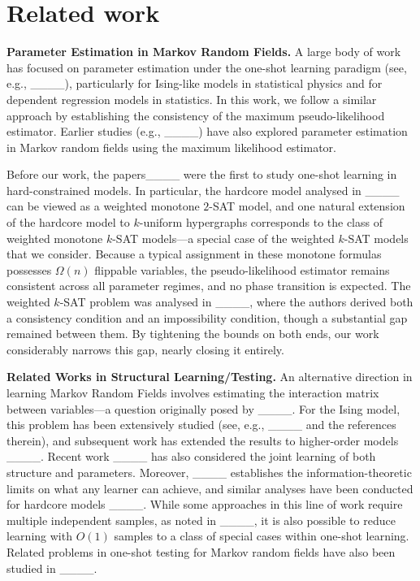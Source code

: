 \section{Related work}
\noindent \textbf{Parameter Estimation in Markov Random Fields.}  A large body of work has focused on parameter estimation under the one-shot learning paradigm (see, e.g., ____), particularly for Ising-like models in statistical physics and for dependent regression models in statistics. In this work, we follow a similar approach by establishing the consistency of the maximum pseudo-likelihood estimator.  Earlier studies (e.g., ____) have also explored parameter estimation in Markov random fields using the maximum likelihood estimator.

Before our work, the papers____ were the first to study one-shot learning in hard-constrained models. In particular, the hardcore model analysed in ____ can be viewed as a weighted monotone $2$-SAT model, and one natural extension of the hardcore model to $k$-uniform hypergraphs corresponds to the class of weighted monotone $k$-SAT models—a special case of the weighted $k$-SAT models that we consider. Because a typical assignment in these monotone formulas possesses $\Omega(n)$ flippable variables, the pseudo-likelihood estimator remains consistent across all parameter regimes, and no phase transition is expected. 
The weighted $k$-SAT problem was analysed in ____, where the authors derived both a consistency condition and an impossibility condition, though a substantial gap remained between them. By tightening the bounds on both ends, our work considerably narrows this gap, nearly closing it entirely.

\noindent\textbf{Related Works in Structural Learning/Testing.}
An alternative direction in learning Markov Random Fields involves estimating the interaction matrix between variables—a question originally posed by ____. For the Ising model, this problem has been extensively studied (see, e.g., ____ and the references therein), and subsequent work has extended the results to higher-order models ____. Recent work ____ has also considered the joint learning of both structure and parameters. Moreover, ____ establishes the information-theoretic limits on what any learner can achieve, and similar analyses have been conducted for hardcore models ____.
While some approaches in this line of work require multiple independent samples, as noted in ____, it is also possible to reduce learning with $O(1)$ samples to a class of special cases within one-shot learning. 
Related problems in one-shot testing for Markov random fields have also been studied in ____.